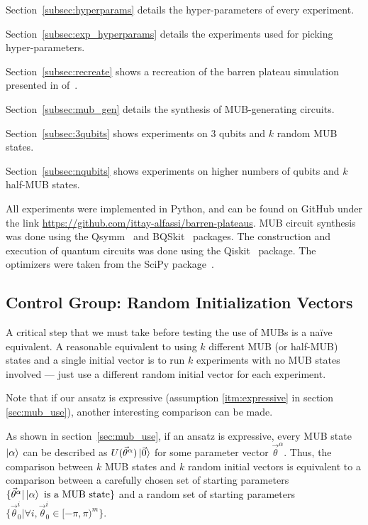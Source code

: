 \documentclass[a4paper,12pt]{article}
\newcommand{\thetas}{\vec{\theta}}
\begin{document}
Section~\ref{subsec:hyperparams} details the hyper-parameters of every experiment.

Section~\ref{subsec:exp_hyperparams} details the experiments used for picking hyper-parameters.

Section~\ref{subsec:recreate} shows a recreation of the barren plateau simulation presented in of~\cite{arrasmith_effect_2021}.

Section~\ref{subsec:mub_gen} details the synthesis of MUB-generating circuits.

Section~\ref{subsec:3qubits} shows experiments on 3 qubits and $k$ random MUB states.

Section~\ref{subsec:nqubits} shows experiments on higher numbers of qubits and $k$ half-MUB states.

All experiments were implemented in Python, and can be found on GitHub under the link \url{https://github.com/ittay-alfassi/barren-plateaus}.
MUB circuit synthesis was done using the Qsymm~\cite{qsymm} and BQSkit~\cite{bqskit} packages.
The construction and execution of quantum circuits was done using the Qiskit~\cite{qiskit} package.
The optimizers were taken from the SciPy package~\cite{scipy}.

\subsection{Control Group: Random Initialization Vectors} \label{subsec:random_thetas}
A critical step that we must take before testing the use of MUBs is a na{\"i}ve equivalent.
A reasonable equivalent to using $k$ different MUB (or half-MUB) states and a single initial vector is to run $k$ experiments with no MUB states involved --- just use a different random initial vector for each experiment.

Note that if our ansatz is expressive (assumption \ref{itm:expressive} in section \ref{sec:mub_use}), another interesting comparison can be made.

As shown in section~\ref{sec:mub_use}, if an ansatz is expressive, every MUB state $\ket{\alpha}$ can be described as $U(\thetas^\alpha)\ket{\vec{0}}$ for some parameter vector $\thetas^\alpha$.
Thus, the comparison between $k$ MUB states and $k$ random initial vectors is equivalent to a comparison between a carefully chosen set of starting parameters $\{\thetas^{\alpha} | \ket{\alpha} \textrm{ is a MUB state}\}$ and a random set of starting parameters $\{\thetas_0^i | \forall i, \thetas_{0}^{i} \in [-\pi, \pi)^m\}$.
\end{document}
